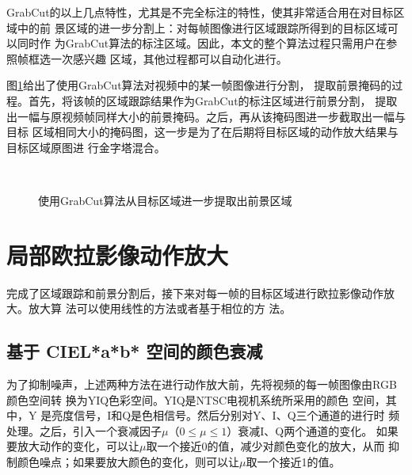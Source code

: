 GrabCut的以上几点特性，尤其是不完全标注的特性，使其非常适合用在对目标区域中的前
景区域的进一步分割上：对每帧图像进行区域跟踪所得到的目标区域可以同时作
为GrabCut算法的标注区域。因此，本文的整个算法过程只需用户在参照帧框选一次感兴趣
区域，其他过程都可以自动化进行。

图\ref{fig:grabcut-result}给出了使用GrabCut算法对视频中的某一帧图像进行分割，
提取前景掩码的过程。首先，将该帧的区域跟踪结果作为GrabCut的标注区域进行前景分割，
提取出一幅与原视频帧同样大小的前景掩码。之后，再从该掩码图进一步截取出一幅与目标
区域相同大小的掩码图，这一步是为了在后期将目标区域的动作放大结果与目标区域原图进
行金字塔混合。

\begin{figure}[htbp]
  \centering
  \qquad
  \qquad\\
  \qquad
  \qquad
  \caption{使用GrabCut算法从目标区域进一步提取出前景区域}
  \label{fig:grabcut-result}
\end{figure}

\section{局部欧拉影像动作放大}
\label{sec:local-evm}

完成了区域跟踪和前景分割后，接下来对每一帧的目标区域进行欧拉影像动作放大。放大算
法可以使用线性的方法或者基于相位的方
法。

\subsection{基于 CIEL*a*b* 空间的颜色衰减}
\label{sec:cielab}

为了抑制噪声，上述两种方法在进行动作放大前，先将视频的每一帧图像由RGB颜色空间转
换为YIQ色彩空间。YIQ是NTSC电视机系统所采用的颜色
空间，其中，Y 是亮度信号，I和Q是色相信号。然后分别对Y、I、Q三个通道的进行时
频处理。之后，引入一个衰减因子$\mu$（$0\le \mu \le 1$）衰减I、Q两个通道的变化。
如果要放大动作的变化，可以让$\mu$取一个接近0的值，减少对颜色变化的放大，从而
抑制颜色噪点；如果要放大颜色的变化，则可以让$\mu$取一个接近1的值。

